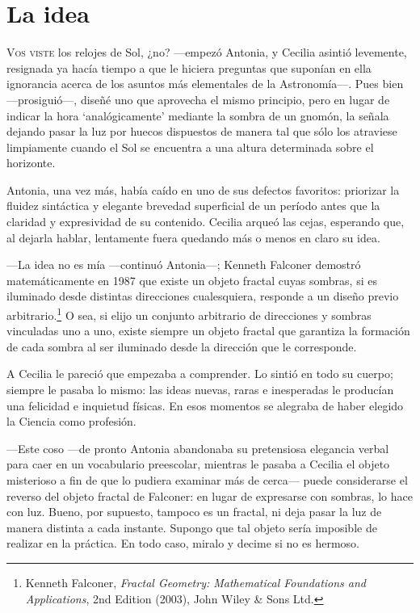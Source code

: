 \chapter{La idea}

\lettrine[ante=\raisebox{-2ex}{\LARGE ---¿},lines=2]{V}{os viste} los
relojes de Sol, ¿no?  ---empezó Antonia, y Cecilia asintió levemente,
resignada ya hacía tiempo a que le hiciera preguntas que suponían en
ella ignorancia acerca de los asuntos más elementales de la
Astronomía---. Pues bien ---pro\-si\-guió---, diseñé uno que aprovecha
el mismo principio, pero en lugar de indicar la hora `analógicamente'
mediante la sombra de un gnomón, la señala dejando pasar la luz por
huecos dispuestos de manera tal que sólo los atraviese limpiamente
cuando el Sol se encuentra a una altura determinada sobre el
horizonte.

Antonia, una vez más, había caído en uno de sus defectos favoritos:
priorizar la fluidez sintáctica y elegante brevedad superficial de un
período antes que la claridad y expresividad de su contenido. Cecilia
arqueó las cejas, esperando que, al dejarla hablar, lentamente fuera
quedando más o menos en claro su idea.

---La idea no es mía ---continuó Antonia---; Kenneth Falconer demostró
matemáticamente en 1987 que existe un objeto fractal cuyas sombras, si
es iluminado desde distintas direcciones cualesquiera, responde a un
diseño previo arbitrario.\footnote{Kenneth Falconer, \emph{Fractal
    Geometry: Mathematical Foundations and Applications}, 2nd Edition
  (2003), John Wiley \& Sons Ltd.} O sea, si elijo un conjunto
arbitrario de direcciones y sombras vinculadas uno a uno, existe
siempre un objeto fractal que garantiza la formación de cada sombra al
ser iluminado desde la dirección que le corresponde.

A Cecilia le pareció que empezaba a comprender. Lo sintió en todo su
cuerpo; siempre le pasaba lo mismo: las ideas nuevas, raras e
inesperadas le producían una felicidad e inquietud físicas. En esos
momentos se alegraba de haber elegido la Ciencia como profesión.

---Este coso ---de pronto Antonia abandonaba su pretensiosa elegancia
verbal para caer en un vocabulario preescolar, mientras le pasaba a
Cecilia el objeto misterioso a fin de que lo pudiera examinar más de
cerca--- puede considerarse el reverso del objeto fractal de Falconer:
en lugar de expresarse con sombras, lo hace con luz. Bueno, por
supuesto, tampoco es un fractal, ni deja pasar la luz de manera
distinta a cada instante. Supongo que tal objeto sería imposible de
realizar en la práctica. En todo caso, miralo y decime si no es
hermoso.

